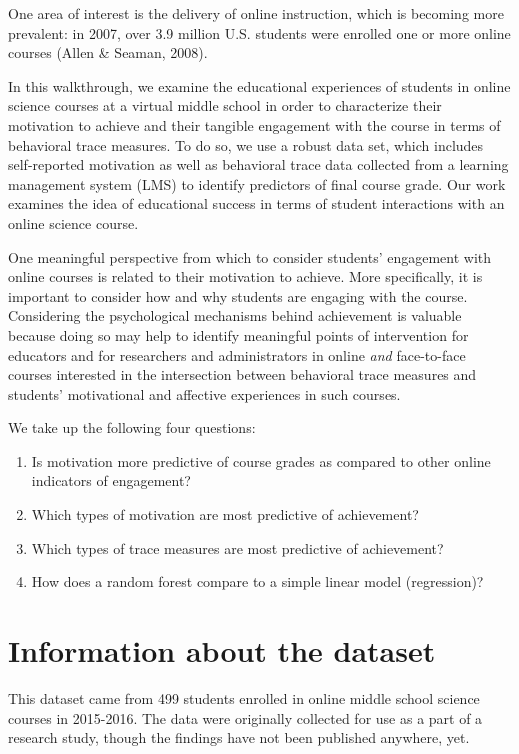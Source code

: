 \documentclass[]{book}
\providecommand{\tightlist}{%
  \setlength{\itemsep}{0pt}\setlength{\parskip}{0pt}}
\begin{document}
One area of interest is the delivery of online instruction, which is
becoming more prevalent: in 2007, over 3.9 million U.S. students were
enrolled one or more online courses (Allen \& Seaman, 2008).

In this walkthrough, we examine the educational experiences of students
in online science courses at a virtual middle school in order to
characterize their motivation to achieve and their tangible engagement
with the course in terms of behavioral trace measures. To do so, we use
a robust data set, which includes self-reported motivation as well as
behavioral trace data collected from a learning management system (LMS)
to identify predictors of final course grade. Our work examines the idea
of educational success in terms of student interactions with an online
science course.

One meaningful perspective from which to consider students' engagement
with online courses is related to their motivation to achieve. More
specifically, it is important to consider how and why students are
engaging with the course. Considering the psychological mechanisms
behind achievement is valuable because doing so may help to identify
meaningful points of intervention for educators and for researchers and
administrators in online \emph{and} face-to-face courses interested in
the intersection between behavioral trace measures and students'
motivational and affective experiences in such courses.

We take up the following four questions:

\begin{enumerate}
\def\labelenumi{\arabic{enumi}.}
\tightlist
\item
  Is motivation more predictive of course grades as compared to other
  online indicators of engagement?
\item
  Which types of motivation are most predictive of achievement?
\item
  Which types of trace measures are most predictive of achievement?
\item
  How does a random forest compare to a simple linear model
  (regression)?
\end{enumerate}

\section{Information about the
dataset}\label{information-about-the-dataset}

This dataset came from 499 students enrolled in online middle school
science courses in 2015-2016. The data were originally collected for use
as a part of a research study, though the findings have not been
published anywhere, yet.
\end{document}
